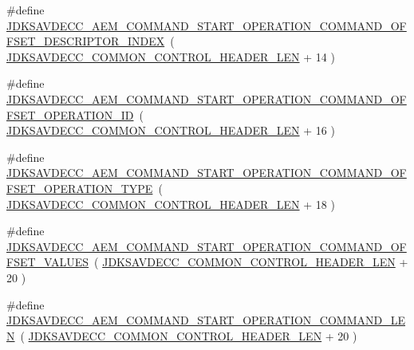 \begin{DoxyCompactItemize}
\#define \hyperlink{group__command__start__operation_gaae0c9a246aec08d8a23b7c9475a534cb}{J\+D\+K\+S\+A\+V\+D\+E\+C\+C\+\_\+\+A\+E\+M\+\_\+\+C\+O\+M\+M\+A\+N\+D\+\_\+\+S\+T\+A\+R\+T\+\_\+\+O\+P\+E\+R\+A\+T\+I\+O\+N\+\_\+\+C\+O\+M\+M\+A\+N\+D\+\_\+\+O\+F\+F\+S\+E\+T\+\_\+\+D\+E\+S\+C\+R\+I\+P\+T\+O\+R\+\_\+\+I\+N\+D\+EX}~( \hyperlink{group__jdksavdecc__avtp__common__control__header_gaae84052886fb1bb42f3bc5f85b741dff}{J\+D\+K\+S\+A\+V\+D\+E\+C\+C\+\_\+\+C\+O\+M\+M\+O\+N\+\_\+\+C\+O\+N\+T\+R\+O\+L\+\_\+\+H\+E\+A\+D\+E\+R\+\_\+\+L\+EN} + 14 )
\item 
\#define \hyperlink{group__command__start__operation_ga16966da87cb4ed32081b62661cd8db90}{J\+D\+K\+S\+A\+V\+D\+E\+C\+C\+\_\+\+A\+E\+M\+\_\+\+C\+O\+M\+M\+A\+N\+D\+\_\+\+S\+T\+A\+R\+T\+\_\+\+O\+P\+E\+R\+A\+T\+I\+O\+N\+\_\+\+C\+O\+M\+M\+A\+N\+D\+\_\+\+O\+F\+F\+S\+E\+T\+\_\+\+O\+P\+E\+R\+A\+T\+I\+O\+N\+\_\+\+ID}~( \hyperlink{group__jdksavdecc__avtp__common__control__header_gaae84052886fb1bb42f3bc5f85b741dff}{J\+D\+K\+S\+A\+V\+D\+E\+C\+C\+\_\+\+C\+O\+M\+M\+O\+N\+\_\+\+C\+O\+N\+T\+R\+O\+L\+\_\+\+H\+E\+A\+D\+E\+R\+\_\+\+L\+EN} + 16 )
\item 
\#define \hyperlink{group__command__start__operation_ga0e8b0176434128bc788ed50a6f43e6b8}{J\+D\+K\+S\+A\+V\+D\+E\+C\+C\+\_\+\+A\+E\+M\+\_\+\+C\+O\+M\+M\+A\+N\+D\+\_\+\+S\+T\+A\+R\+T\+\_\+\+O\+P\+E\+R\+A\+T\+I\+O\+N\+\_\+\+C\+O\+M\+M\+A\+N\+D\+\_\+\+O\+F\+F\+S\+E\+T\+\_\+\+O\+P\+E\+R\+A\+T\+I\+O\+N\+\_\+\+T\+Y\+PE}~( \hyperlink{group__jdksavdecc__avtp__common__control__header_gaae84052886fb1bb42f3bc5f85b741dff}{J\+D\+K\+S\+A\+V\+D\+E\+C\+C\+\_\+\+C\+O\+M\+M\+O\+N\+\_\+\+C\+O\+N\+T\+R\+O\+L\+\_\+\+H\+E\+A\+D\+E\+R\+\_\+\+L\+EN} + 18 )
\item 
\#define \hyperlink{group__command__start__operation_gaa36a30e47fc0ad447d4c9c9e92435a80}{J\+D\+K\+S\+A\+V\+D\+E\+C\+C\+\_\+\+A\+E\+M\+\_\+\+C\+O\+M\+M\+A\+N\+D\+\_\+\+S\+T\+A\+R\+T\+\_\+\+O\+P\+E\+R\+A\+T\+I\+O\+N\+\_\+\+C\+O\+M\+M\+A\+N\+D\+\_\+\+O\+F\+F\+S\+E\+T\+\_\+\+V\+A\+L\+U\+ES}~( \hyperlink{group__jdksavdecc__avtp__common__control__header_gaae84052886fb1bb42f3bc5f85b741dff}{J\+D\+K\+S\+A\+V\+D\+E\+C\+C\+\_\+\+C\+O\+M\+M\+O\+N\+\_\+\+C\+O\+N\+T\+R\+O\+L\+\_\+\+H\+E\+A\+D\+E\+R\+\_\+\+L\+EN} + 20 )
\item 
\#define \hyperlink{group__command__start__operation_gadc16cfcdc418cdc8d97b9593e4d3cea1}{J\+D\+K\+S\+A\+V\+D\+E\+C\+C\+\_\+\+A\+E\+M\+\_\+\+C\+O\+M\+M\+A\+N\+D\+\_\+\+S\+T\+A\+R\+T\+\_\+\+O\+P\+E\+R\+A\+T\+I\+O\+N\+\_\+\+C\+O\+M\+M\+A\+N\+D\+\_\+\+L\+EN}~( \hyperlink{group__jdksavdecc__avtp__common__control__header_gaae84052886fb1bb42f3bc5f85b741dff}{J\+D\+K\+S\+A\+V\+D\+E\+C\+C\+\_\+\+C\+O\+M\+M\+O\+N\+\_\+\+C\+O\+N\+T\+R\+O\+L\+\_\+\+H\+E\+A\+D\+E\+R\+\_\+\+L\+EN} + 20 )
\end{DoxyCompactItemize}
